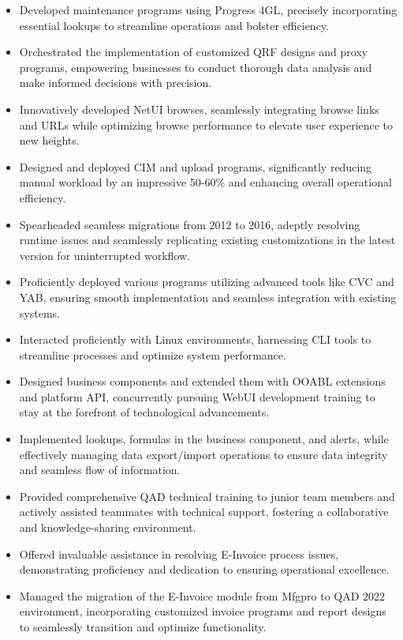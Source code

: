 \documentclass{curriculum-vitae}
\begin{document}
\begin{itemize}
   \item Developed maintenance programs using Progress 4GL, precisely
      incorporating essential lookups to streamline operations and bolster
      efficiency.
   \item Orchestrated the implementation of customized QRF designs and proxy
      programs, empowering businesses to conduct thorough data analysis and
      make informed decisions with precision.
   \item Innovatively developed NetUI browses, seamlessly integrating browse
      links and URLs while optimizing browse performance to elevate user
      experience to new heights.
   \item Designed and deployed CIM and upload programs, significantly reducing
      manual workload by an impressive 50-60\% and enhancing overall operational
      efficiency.
   \item Spearheaded seamless migrations from 2012 to 2016, adeptly resolving
      runtime issues and seamlessly replicating existing customizations in the
      latest version for uninterrupted workflow.
   \item Proficiently deployed various programs utilizing advanced tools like
      CVC and YAB, ensuring smooth implementation and seamless integration with
      existing systems.
   \item Interacted proficiently with Linux environments, harnessing CLI tools
      to streamline processes and optimize system performance.
   \item Designed business components and extended them with OOABL extensions
      and platform API, concurrently pursuing WebUI development training to
      stay at the forefront of technological advancements.
   \item Implemented lookups, formulas in the business component, and alerts,
      while effectively managing data export/import operations to ensure data
      integrity and seamless flow of information.
   \item Provided comprehensive QAD technical training to junior team members
      and actively assisted teammates with technical support, fostering a
      collaborative and knowledge-sharing environment.
   \item Offered invaluable assistance in resolving E-Invoice process issues,
      demonstrating proficiency and dedication to ensuring operational
      excellence.
   \item Managed the migration of the E-Invoice module from Mfgpro to QAD 2022
      environment, incorporating customized invoice programs and report designs
      to seamlessly transition and optimize functionality.
\end{itemize}
\end{document}
